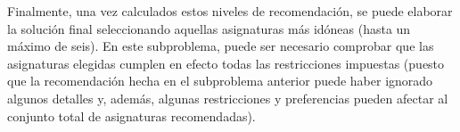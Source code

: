 Finalmente, una vez calculados estos niveles de recomendación, se puede 
elaborar la solución final seleccionando aquellas asignaturas más idóneas 
(hasta un máximo de seis). En este subproblema, puede ser necesario comprobar 
que las asignaturas elegidas cumplen en efecto todas las restricciones 
impuestas (puesto que la recomendación hecha en el subproblema anterior puede 
haber ignorado algunos detalles y, además, algunas restricciones y 
preferencias pueden afectar al conjunto total de asignaturas recomendadas).






